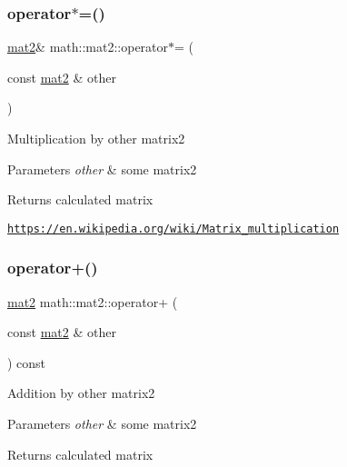 \subsubsection{\texorpdfstring{operator$\ast$=()}{operator*=()}\hspace{0.1cm}{\footnotesize\ttfamily [2/2]}}
{\footnotesize\ttfamily \hyperlink{structmath_1_1mat2}{mat2}\& math\+::mat2\+::operator$\ast$= (\begin{DoxyParamCaption}\item[{const \hyperlink{structmath_1_1mat2}{mat2} \&}]{other }\end{DoxyParamCaption})\hspace{0.3cm}{\ttfamily [inline]}}

Multiplication by other matrix2 
\begin{DoxyParams}{Parameters}
{\em other} & some matrix2 \\
\hline
\end{DoxyParams}
\begin{DoxyReturn}{Returns}
calculated matrix
\end{DoxyReturn}
\href{https://en.wikipedia.org/wiki/Matrix_multiplication}{\tt https\+://en.\+wikipedia.\+org/wiki/\+Matrix\+\_\+multiplication} \mbox{\label{structmath_1_1mat2_a59ef3a67aed221a0bb05c27accc83fec}} 
\subsubsection{\texorpdfstring{operator+()}{operator+()}}
{\footnotesize\ttfamily \hyperlink{structmath_1_1mat2}{mat2} math\+::mat2\+::operator+ (\begin{DoxyParamCaption}\item[{const \hyperlink{structmath_1_1mat2}{mat2} \&}]{other }\end{DoxyParamCaption}) const\hspace{0.3cm}{\ttfamily [inline]}}

Addition by other matrix2 
\begin{DoxyParams}{Parameters}
{\em other} & some matrix2 \\
\hline
\end{DoxyParams}
\begin{DoxyReturn}{Returns}
calculated matrix 
\end{DoxyReturn}
\mbox{\label{structmath_1_1mat2_a7266a3b96614a92227581b6ff656021f}} 
